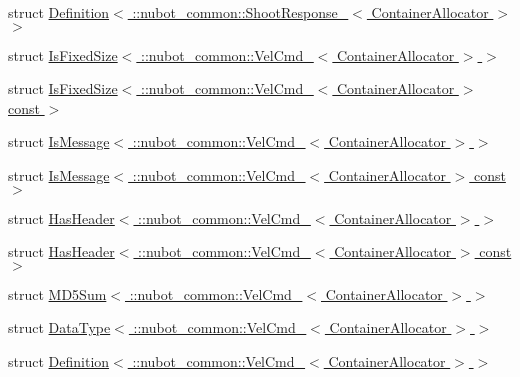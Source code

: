 \begin{DoxyCompactItemize}
\item 
struct \hyperlink{structros_1_1message__traits_1_1Definition_3_01_1_1nubot__common_1_1ShootResponse___3_01ContainerAllocator_01_4_01_4}{Definition$<$ \-::nubot\-\_\-common\-::\-Shoot\-Response\-\_\-$<$ Container\-Allocator $>$ $>$}
\item 
struct \hyperlink{structros_1_1message__traits_1_1IsFixedSize_3_01_1_1nubot__common_1_1VelCmd___3_01ContainerAllocator_01_4_01_4}{Is\-Fixed\-Size$<$ \-::nubot\-\_\-common\-::\-Vel\-Cmd\-\_\-$<$ Container\-Allocator $>$ $>$}
\item 
struct \hyperlink{structros_1_1message__traits_1_1IsFixedSize_3_01_1_1nubot__common_1_1VelCmd___3_01ContainerAllocator_01_4_01const_01_01_4}{Is\-Fixed\-Size$<$ \-::nubot\-\_\-common\-::\-Vel\-Cmd\-\_\-$<$ Container\-Allocator $>$ const  $>$}
\item 
struct \hyperlink{structros_1_1message__traits_1_1IsMessage_3_01_1_1nubot__common_1_1VelCmd___3_01ContainerAllocator_01_4_01_4}{Is\-Message$<$ \-::nubot\-\_\-common\-::\-Vel\-Cmd\-\_\-$<$ Container\-Allocator $>$ $>$}
\item 
struct \hyperlink{structros_1_1message__traits_1_1IsMessage_3_01_1_1nubot__common_1_1VelCmd___3_01ContainerAllocator_01_4_01const_01_01_4}{Is\-Message$<$ \-::nubot\-\_\-common\-::\-Vel\-Cmd\-\_\-$<$ Container\-Allocator $>$ const  $>$}
\item 
struct \hyperlink{structros_1_1message__traits_1_1HasHeader_3_01_1_1nubot__common_1_1VelCmd___3_01ContainerAllocator_01_4_01_4}{Has\-Header$<$ \-::nubot\-\_\-common\-::\-Vel\-Cmd\-\_\-$<$ Container\-Allocator $>$ $>$}
\item 
struct \hyperlink{structros_1_1message__traits_1_1HasHeader_3_01_1_1nubot__common_1_1VelCmd___3_01ContainerAllocator_01_4_01const_01_01_4}{Has\-Header$<$ \-::nubot\-\_\-common\-::\-Vel\-Cmd\-\_\-$<$ Container\-Allocator $>$ const  $>$}
\item 
struct \hyperlink{structros_1_1message__traits_1_1MD5Sum_3_01_1_1nubot__common_1_1VelCmd___3_01ContainerAllocator_01_4_01_4}{M\-D5\-Sum$<$ \-::nubot\-\_\-common\-::\-Vel\-Cmd\-\_\-$<$ Container\-Allocator $>$ $>$}
\item 
struct \hyperlink{structros_1_1message__traits_1_1DataType_3_01_1_1nubot__common_1_1VelCmd___3_01ContainerAllocator_01_4_01_4}{Data\-Type$<$ \-::nubot\-\_\-common\-::\-Vel\-Cmd\-\_\-$<$ Container\-Allocator $>$ $>$}
\item 
struct \hyperlink{structros_1_1message__traits_1_1Definition_3_01_1_1nubot__common_1_1VelCmd___3_01ContainerAllocator_01_4_01_4}{Definition$<$ \-::nubot\-\_\-common\-::\-Vel\-Cmd\-\_\-$<$ Container\-Allocator $>$ $>$}
\end{DoxyCompactItemize}
